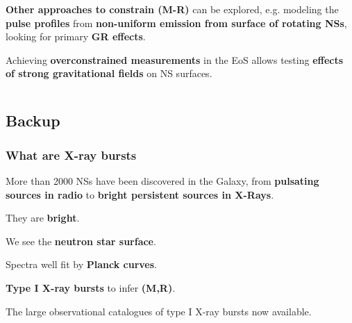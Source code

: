 \begin{frame}
\begin{columns}[c]
\begin{column}{0.55\textwidth}
\begin{enumerate}
{ \quad
 
 \item  {\bf Other approaches to constrain (M-R)} can be explored, e.g. modeling the {\bf pulse profiles} from {\bf non-uniform emission from surface of rotating NSs}, looking for primary {\bf GR effects}.
 

 
 \quad
 
 \item Achieving  {\bf overconstrained measurements} in the EoS allows testing {\bf effects of strong gravitational fields} on NS surfaces.
 }
\end{enumerate}
\end{column}

\end{columns}
\end{frame}





\subsection*{Backup}

\begin{frame}
\frametitle{What are X-ray bursts}
\begin{itemize}\scriptsize{
 \item More than 2000 NSs have been discovered in the Galaxy, from {\bf pulsating sources in radio} to {\bf bright persistent sources in X-Rays}.
 
 \quad
 
 \item They are {\bf bright}.
 
 \quad 
 
 \item We see the {\bf neutron star surface}.
 
 \quad
 
 \item Spectra well fit by {\bf Planck curves}.
 
 \quad
 
 \item {\bf Type I X-ray bursts} to infer {\bf (M,R)}.
 
 \quad
 

\item The large observational catalogues of type I X-ray bursts now available.
}
\end{itemize}
\end{frame}





